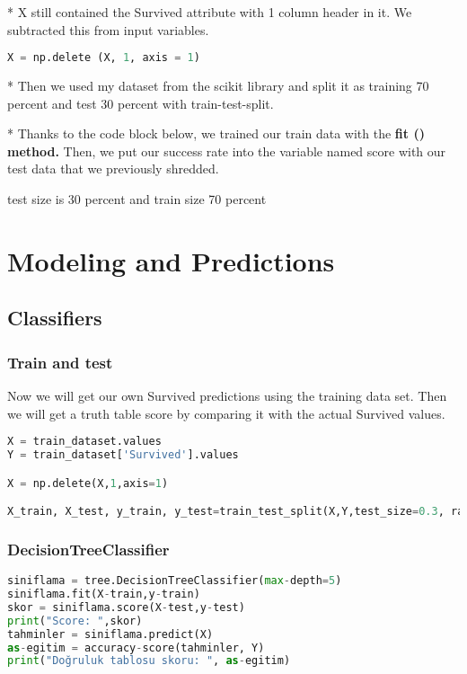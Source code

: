\documentclass[onecolumn]{article}
\begin{document}
* X still contained the Survived attribute with 1 column header in it. We subtracted this from input variables.

\begin{lstlisting}[language=Python, caption= concat] 
X = np.delete (X, 1, axis = 1)
\end{lstlisting}

* Then we used my dataset from the scikit library and split it as
 training 70 percent  and test 30 percent with train-test-split.

* Thanks to the code block below, we trained our train data with the \textbf{fit () method.} Then, we put our success rate into the variable named score with our test data that we previously shredded.


test size is 30 percent and train size 70 percent
\section{Modeling and Predictions}

\subsection{Classifiers}

\subsubsection{Train and test }

Now we will get our own Survived predictions using the training data set. Then we will get a truth table score by comparing it with the actual Survived values.

\begin{lstlisting}[language=Python, caption= train and test] 
X = train_dataset.values
Y = train_dataset['Survived'].values

X = np.delete(X,1,axis=1)

X_train, X_test, y_train, y_test=train_test_split(X,Y,test_size=0.3, random_state=0) #test size 30 atadÄ±k train test de 70 oldu
\end{lstlisting}

\subsubsection{DecisionTreeClassifier}

\begin{lstlisting}[language=Python, caption= DecisionTreeClassifier ] 
siniflama = tree.DecisionTreeClassifier(max-depth=5)
siniflama.fit(X-train,y-train)
skor = siniflama.score(X-test,y-test)
print("Score: ",skor)
tahminler = siniflama.predict(X)
as-egitim = accuracy-score(tahminler, Y)
print("Doğruluk tablosu skoru: ", as-egitim)
\end{lstlisting}
\end{document}
